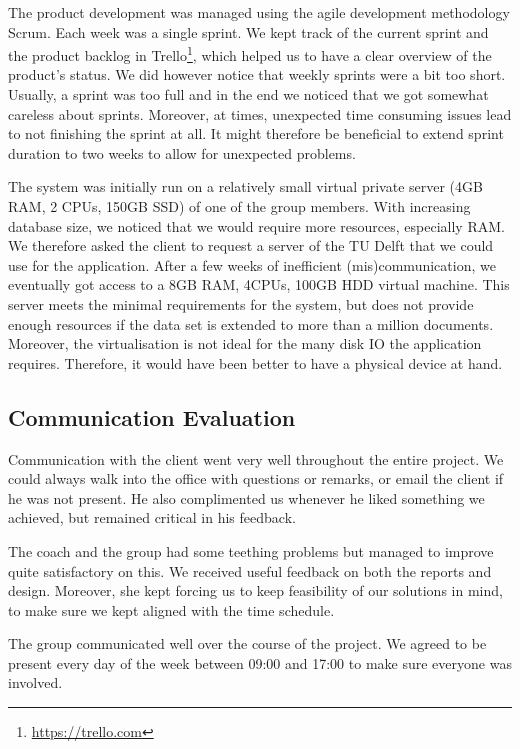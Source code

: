 The product development was managed using the agile development methodology Scrum. Each week was a single sprint. We kept track of the current sprint and the product backlog in Trello\footnote{\url{https://trello.com}}, which helped us to have a clear overview of the product's status. We did however notice that weekly sprints were a bit too short. Usually, a sprint was too full and in the end we noticed that we got somewhat careless about sprints. Moreover, at times, unexpected time consuming issues lead to not finishing the sprint at all. It might therefore be beneficial to extend sprint duration to two weeks to allow for unexpected problems.

The system was initially run on a relatively small virtual private server (4GB RAM, 2 CPUs, 150GB SSD) of one of the group members. With increasing database size, we noticed that we would require more resources, especially RAM. We therefore asked the client to request a server of the TU Delft that we could use for the application. After a few weeks of inefficient (mis)communication, we eventually got access to a 8GB RAM, 4CPUs, 100GB HDD virtual machine. This server meets the minimal requirements for the system, but does not provide enough resources if the data set is extended to more than a million documents. Moreover, the virtualisation is not ideal for the many disk IO the application requires. Therefore, it would have been better to have a physical device at hand.

\subsection{Communication Evaluation}
Communication with the client went very well throughout the entire project. We could always walk into the office with questions or remarks, or email the client if he was not present. He also complimented us whenever he liked something we achieved, but remained critical in his feedback.

The coach and the group had some teething problems but managed to improve quite satisfactory on this. We received useful feedback on both the reports and design. Moreover, she kept forcing us to keep feasibility of our solutions in mind, to make sure we kept aligned with the time schedule.

The group communicated well over the course of the project. We agreed to be present every day of the week between 09:00 and 17:00 to make sure everyone was involved.